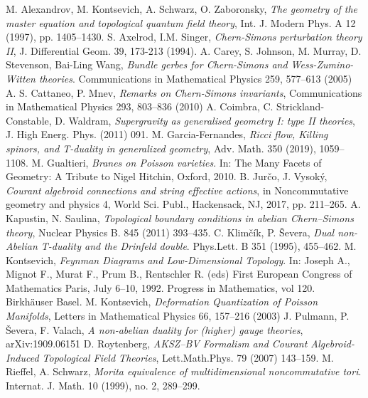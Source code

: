 \documentclass[a4paper]{amsart}
\theoremstyle{plain}
\theoremstyle{definition}
\begin{document}
\begin{thebibliography}{99}
 M. Alexandrov, M. Kontsevich, A. Schwarz, O. Zaboronsky, \emph{The geometry of the master equation and topological quantum field theory}, Int. J. Modern Phys. A 12 (1997), pp. 1405--1430.
 S. Axelrod, I.M. Singer, \emph{Chern-Simons perturbation theory II}, J. Differential Geom.
 39, 173-213 (1994).
 A. Carey, S. Johnson, M. Murray, D. Stevenson, Bai-Ling Wang, \emph{Bundle gerbes for Chern-Simons and Wess-Zumino-Witten theories}. Communications in Mathematical Physics 259, 577–613 (2005)
 A. S. Cattaneo, P. Mnev, \emph{Remarks on Chern-Simons invariants}, Communications in Mathematical Physics 293, 803--836 (2010)
 A. Coimbra, C. Strickland-Constable, D. Waldram, \emph{Supergravity as generalised geometry I: type II theories}, J. High Energ. Phys. (2011) 091.
 M. Garcia-Fernandes, \emph{Ricci flow, Killing spinors, and T-duality in generalized geometry}, Adv. Math. 350 (2019), 1059–1108.
 M. Gualtieri, \emph{Branes on Poisson varieties}. In: The Many Facets of Geometry: A Tribute to Nigel Hitchin, Oxford, 2010.
 B. Jurčo, J. Vysoký, \emph{Courant algebroid connections and string effective actions}, in
Noncommutative geometry and physics 4, World Sci. Publ., Hackensack, NJ, 2017, pp. 211–265.
  A. Kapustin, N. Saulina, \emph{Topological boundary conditions in abelian Chern–Simons theory}, Nuclear Physics B. 845 (2011) 393--435.
 C. Klimčík, P. Ševera, \emph{Dual non-Abelian T-duality and the Drinfeld double}. Phys.Lett. B 351 (1995), 455--462.
 M. Kontsevich, \emph{Feynman Diagrams and Low-Dimensional Topology}. In: Joseph A., Mignot F., Murat F., Prum B., Rentschler R. (eds) First European Congress of Mathematics Paris, July 6–10, 1992. Progress in Mathematics, vol 120. Birkhäuser Basel.
 M. Kontsevich, \emph{Deformation Quantization of Poisson Manifolds}, Letters in Mathematical Physics 66, 157–216 (2003)
 J. Pulmann, P. Ševera, F. Valach, \emph{A non-abelian duality for (higher) gauge theories}, arXiv:1909.06151
 D. Roytenberg, \emph{AKSZ–BV Formalism and Courant Algebroid-Induced Topological Field Theories}, Lett.Math.Phys. 79 (2007) 143--159.
 M. Rieffel, A. Schwarz, \emph{Morita equivalence of multidimensional noncommutative tori}. Internat. J. Math. 10 (1999), no. 2, 289–299.

\end{thebibliography}
\end{document}
